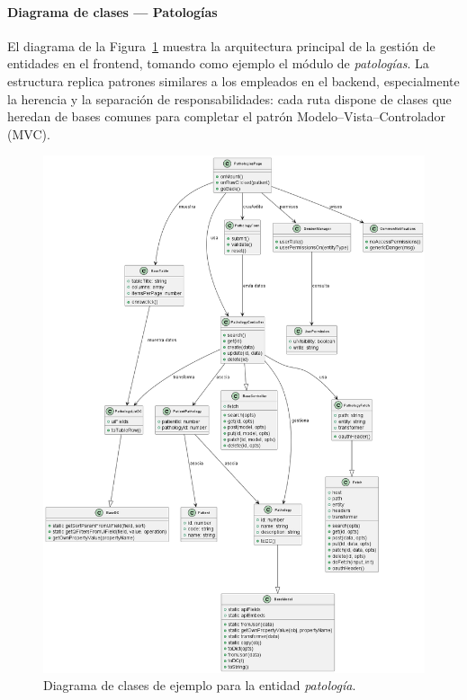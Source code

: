 \documentclass[12pt, a4paper]{article}
\begin{document}
\paragraph{Diagrama de clases — Patologías}



El diagrama de la Figura~\ref{fig:diafron} muestra la arquitectura principal de la gestión de entidades en el frontend, tomando como ejemplo el módulo de \emph{patologías}. La estructura replica patrones similares a los empleados en el backend, especialmente la herencia y la separación de responsabilidades: cada ruta dispone de clases que heredan de bases comunes para completar el patrón Modelo–Vista–Controlador (MVC).

\begin{figure}[htbp]
	\centering
	\includegraphics[width=1\textwidth]{images/ClaseFRONTEND.png}
	\caption[Diagrama de clases del frontend]{Diagrama de clases de ejemplo para la entidad \emph{patología}.}
	\label{fig:diafron}
\end{figure}
\end{document}

